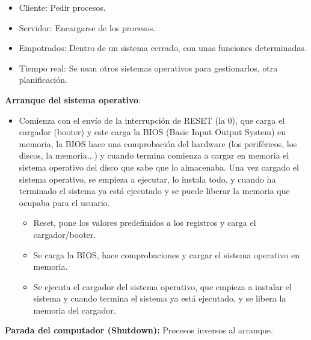 \documentclass[12pt, twoside, openright]{report} %
\begin{document}
\begin{itemize}
    \begin{itemize}
    \item Cliente: Pedir procesos.
      
    \item Servidor: Encargarse de los procesos.
      
    \item Empotrados: Dentro de un sistema cerrado, con unas funciones
      determinadas.
      
    \item Tiempo real: Se usan otros sistemas operativos para gestionarlos,
      otra planificación.
      
    \end{itemize}
  \end{itemize}
  
  \textbf{Arranque del sistema operativo}:
  

  \begin{itemize}
  \item Comienza con el envío de la interrupción de RESET (la 0), que carga
    el cargador (booter) y este carga la BIOS (Basic Input Output
    System) en memoria, la BIOS hace una comprobación del hardware (los
    periféricos, los discos, la memoria...) y cuando termina comienza a
    cargar en memoria el sistema operativo del disco que sabe que lo
    almacenaba. Una vez cargado el sistema operativo, se empieza a
    ejecutar, lo instala todo, y cuando ha terminado el sistema ya está
    ejecutado y se puede liberar la memoria que ocupaba para el usuario.
    

    \begin{itemize}
    \item Reset, pone los valores predefinidos a los registros y carga el
      cargador/booter.
      
    \item Se carga la BIOS, hace comprobaciones y cargar el sistema
      operativo en memoria.
      
    \item Se ejecuta el cargador del sistema operativo, que empieza a
      instalar el sistema y cuando termina el sistema ya está ejecutado,
      y se libera la memoria del cargador.
      
    \end{itemize}
  \end{itemize}
  
  \textbf{Parada del computador (Shutdown):} Procesos inversos al
  arranque.
  
\end{document}
